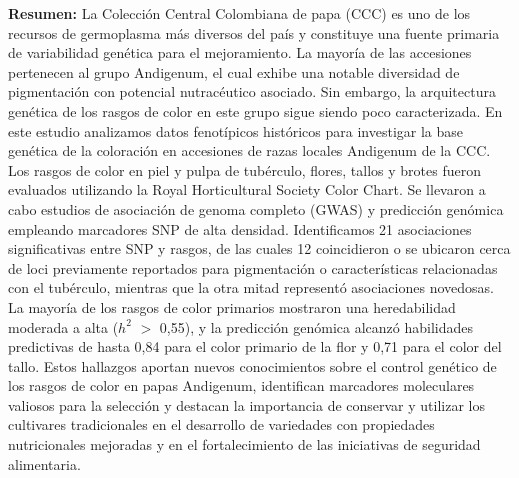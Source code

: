 \documentclass[pdflatex,sn-mathphys-ay]{sn-jnl}%
\begin{document}
{\textbf{Resumen:}
La Colección Central Colombiana de papa (CCC) es uno de los recursos de germoplasma más diversos del país y constituye una fuente primaria de variabilidad genética para el mejoramiento. La mayoría de las accesiones pertenecen al grupo Andigenum, el cual exhibe una notable diversidad de pigmentación con potencial nutracéutico asociado. Sin embargo, la arquitectura genética de los rasgos de color en este grupo sigue siendo poco caracterizada. En este estudio analizamos datos fenotípicos históricos para investigar la base genética de la coloración en accesiones de razas locales Andigenum de la CCC. Los rasgos de color en piel y pulpa de tubérculo, flores, tallos y brotes fueron evaluados utilizando la Royal Horticultural Society Color Chart. Se llevaron a cabo estudios de asociación de genoma completo (GWAS) y predicción genómica empleando marcadores SNP de alta densidad. Identificamos 21 asociaciones significativas entre SNP y rasgos, de las cuales 12 coincidieron o se ubicaron cerca de loci previamente reportados para pigmentación o características relacionadas con el tubérculo, mientras que la otra mitad representó asociaciones novedosas. La mayoría de los rasgos de color primarios mostraron una heredabilidad moderada a alta ($h^2$ $>$ 0,55), y la predicción genómica alcanzó habilidades predictivas de hasta 0,84 para el color primario de la flor y 0,71 para el color del tallo. Estos hallazgos aportan nuevos conocimientos sobre el control genético de los rasgos de color en papas Andigenum, identifican marcadores moleculares valiosos para la selección y destacan la importancia de conservar y utilizar los cultivares tradicionales en el desarrollo de variedades con propiedades nutricionales mejoradas y en el fortalecimiento de las iniciativas de seguridad alimentaria.}




\end{document}
